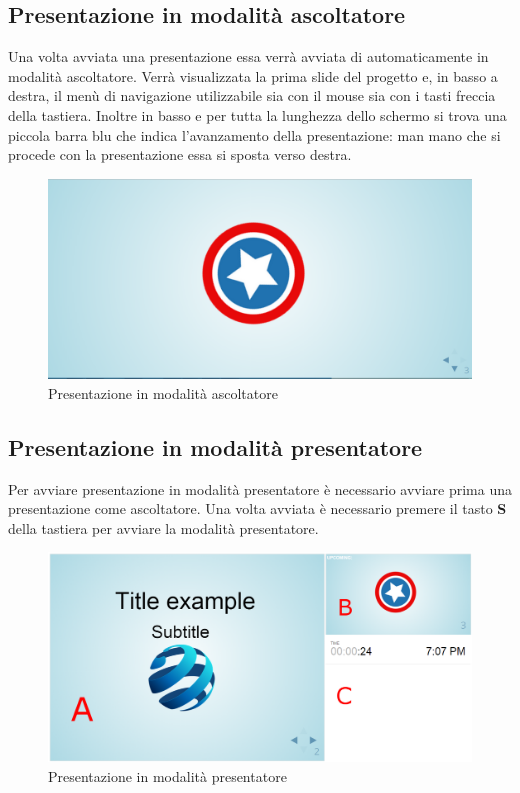 \subsection{Presentazione in modalità ascoltatore}

\noindent Una volta avviata una presentazione essa verrà avviata di automaticamente in modalità ascoltatore. Verrà visualizzata la prima slide del progetto e, in basso a destra, il menù di navigazione utilizzabile sia con il mouse sia con i tasti freccia della tastiera. Inoltre in basso e per tutta la lunghezza dello schermo si trova una piccola barra blu che indica l'avanzamento della presentazione: man mano che si procede con la presentazione essa si sposta verso destra.
\begin{figure}[H] 
	\centering 
	\includegraphics[scale=0.40] {img/sfondook.png}
	\caption{Presentazione in modalità ascoltatore} 
\end{figure}


\subsection{Presentazione in modalità presentatore}
\noindent Per avviare presentazione in modalità presentatore è necessario avviare prima una presentazione come ascoltatore. Una volta avviata è necessario premere il tasto \textbf{S} della tastiera per avviare la modalità presentatore.
\begin{figure}[H] 
	\centering 
	\includegraphics[scale=0.40] {img/note.png}
	\caption{Presentazione in modalità presentatore} 
\end{figure}


